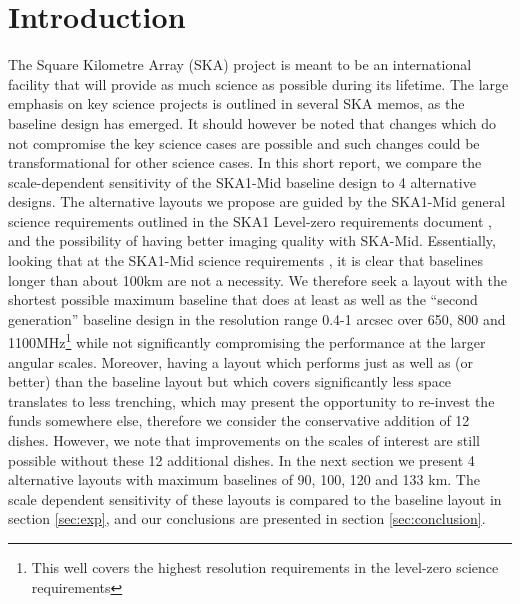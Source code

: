 \documentclass[sfheadings,a4paper,times,10pt,floats,floatfix]{article}
\begin{document}
\section{Introduction}
\vspace{-.1cm}
The Square Kilometre Array (SKA) project is meant to be an international facility that will provide as much science as possible
during its lifetime. The large emphasis on key science projects is outlined in several SKA memos, as the baseline design has
emerged. It should however be noted that changes which do not compromise the key science cases are possible and such changes could
be transformational for other science cases. In this short report, we compare the scale-dependent sensitivity of the SKA1-Mid
baseline design to 4 alternative designs. The alternative layouts we propose are guided by the SKA1-Mid general science
requirements outlined in the SKA1 Level-zero requirements document \cite{srd}, and the possibility of having better imaging
quality with SKA-Mid. Essentially, looking that at the SKA1-Mid science requirements \cite{srd}, it is clear that baselines longer
than about 100km are not a necessity. We therefore seek a layout with the shortest possible maximum baseline that does at least as
well as the ``second generation'' baseline design in the resolution range 0.4-1 arcsec over 650, 800 and 1100MHz\footnote{This
well covers the highest resolution requirements in the level-zero science requirements} while not significantly compromising the
performance at the larger angular scales. Moreover, having a layout which performs just as well as (or better) than the baseline
layout but which covers significantly less space translates to less trenching, which may present the opportunity to re-invest the
funds somewhere else, therefore we consider the conservative addition of 12 dishes. However, we note that improvements on the
scales of interest are still possible without these 12 additional dishes. In the next section we present 4 alternative layouts
with maximum baselines of 90, 100, 120 and 133 km. The scale dependent sensitivity of these layouts is compared to the
baseline layout in section \ref{sec:exp}, and our conclusions are presented in section \ref{sec:conclusion}.
\end{document}
